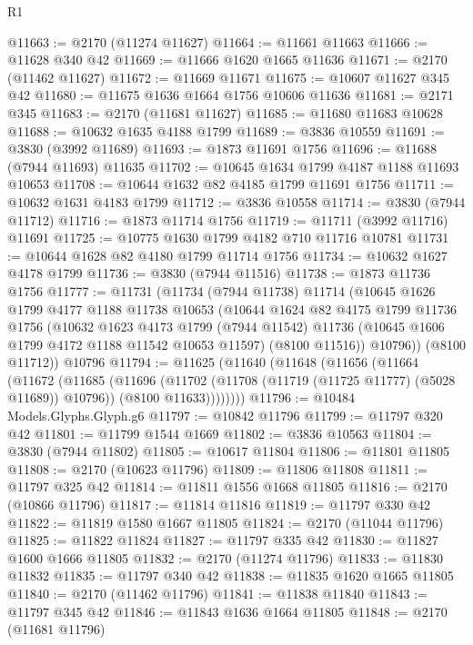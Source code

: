 \begin{lexlean}{R1}
\begin{coremodule}
@11663 := @2170 (@11274 @11627)
@11664 := @11661 @11663
@11666 := @11628 @340 @42
@11669 := @11666 @1620 @1665 @11636
@11671 := @2170 (@11462 @11627)
@11672 := @11669 @11671
@11675 := @10607 @11627 @345 @42
@11680 := @11675 @1636 @1664 @1756 @10606 @11636
@11681 := @2171 @345
@11683 := @2170 (@11681 @11627)
@11685 := @11680 @11683 @10628
@11688 := @10632 @1635 @4188 @1799
@11689 := @3836 @10559
@11691 := @3830 (@3992 @11689)
@11693 := @1873 @11691 @1756
@11696 := @11688 (@7944 @11693) @11635
@11702 := @10645 @1634 @1799 @4187 @1188 @11693 @10653
@11708 := @10644 @1632 @82 @4185 @1799 @11691 @1756
@11711 := @10632 @1631 @4183 @1799
@11712 := @3836 @10558
@11714 := @3830 (@7944 @11712)
@11716 := @1873 @11714 @1756
@11719 := @11711 (@3992 @11716) @11691
@11725 := @10775 @1630 @1799 @4182 @710 @11716 @10781
@11731 := @10644 @1628 @82 @4180 @1799 @11714 @1756
@11734 := @10632 @1627 @4178 @1799
@11736 := @3830 (@7944 @11516)
@11738 := @1873 @11736 @1756
@11777 := @11731
    (@11734
      (@7944 @11738)
      @11714
      (@10645
        @1626
        @1799
        @4177
        @1188
        @11738
        @10653
        (@10644
          @1624
          @82
          @4175
          @1799
          @11736
          @1756
          (@10632
            @1623
            @4173
            @1799
            (@7944 @11542)
            @11736
            (@10645 @1606 @1799 @4172 @1188 @11542 @10653 @11597)
            (@8100 @11516))
          @10796))
      (@8100 @11712))
    @10796
@11794 := @11625
    (@11640
      (@11648
        (@11656
          (@11664
            (@11672
              (@11685
                (@11696
                  (@11702 (@11708 (@11719 (@11725 @11777) (@5028 @11689)) @10796))
                  (@8100 @11633))))))))
@11796 := @10484 Models.Glyphs.Glyph.g6
@11797 := @10842 @11796
@11799 := @11797 @320 @42
@11801 := @11799 @1544 @1669
@11802 := @3836 @10563
@11804 := @3830 (@7944 @11802)
@11805 := @10617 @11804
@11806 := @11801 @11805
@11808 := @2170 (@10623 @11796)
@11809 := @11806 @11808
@11811 := @11797 @325 @42
@11814 := @11811 @1556 @1668 @11805
@11816 := @2170 (@10866 @11796)
@11817 := @11814 @11816
@11819 := @11797 @330 @42
@11822 := @11819 @1580 @1667 @11805
@11824 := @2170 (@11044 @11796)
@11825 := @11822 @11824
@11827 := @11797 @335 @42
@11830 := @11827 @1600 @1666 @11805
@11832 := @2170 (@11274 @11796)
@11833 := @11830 @11832
@11835 := @11797 @340 @42
@11838 := @11835 @1620 @1665 @11805
@11840 := @2170 (@11462 @11796)
@11841 := @11838 @11840
@11843 := @11797 @345 @42
@11846 := @11843 @1636 @1664 @11805
@11848 := @2170 (@11681 @11796)

\end{coremodule}
\end{lexlean}
